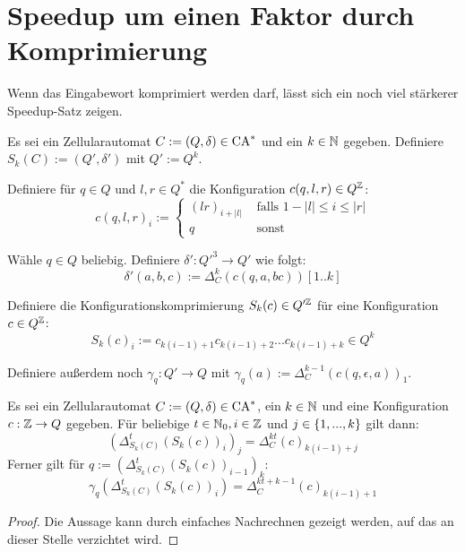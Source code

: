 \section{Speedup um einen Faktor durch Komprimierung}

Wenn das Eingabewort komprimiert werden darf, lässt sich ein noch viel stärkerer Speedup-Satz zeigen.

\begin{definition}
    \label{factorSpeedupConstruction}
    Es sei ein Zellularautomat $C := (Q, \delta) \in \textrm{CA}^*$ und ein $k \in \mathbb{N}$ gegeben.
    Definiere $S_k(C) := (Q', \delta')$ mit $Q' := Q^k$.
    
    Definiere für $q \in Q$ und $l, r \in Q^*$ die Konfiguration $c(q, l, r) \in Q^{\mathbb{Z}}$:
    \[
        c(q, l, r)_i := \begin{cases}
            (lr)_{i + |l|} & \text{ falls } 1-|l| \leq i \leq |r| \\
            q & \text{ sonst}
        \end{cases}
    \]
    
    Wähle $q \in Q$ beliebig.
    Definiere $\delta' : {Q'}^3 \to Q'$ wie folgt:
    \[
        \delta'(a, b, c) := \Delta_C^k(c(q, a, bc))[1..k]
    \]
    
    Definiere die Konfigurationskomprimierung $S_k(c) \in Q'^{\mathbb{Z}}$ für eine Konfiguration $c \in Q^{\mathbb{Z}}$:
    \[
        S_k(c)_i := c_{k(i - 1) + 1}c_{k(i - 1) + 2}...c_{k(i - 1) + k} \in Q^k
    \]
    
    Definiere außerdem noch $\gamma_q : Q' \to Q$ mit
    $\gamma_q(a) := \Delta^{k-1}_C(c(q, \epsilon, a))_1$.
\end{definition}

\begin{satz}
    \label{factorSpeedupConstructionCorrectness}
    Es sei ein Zellularautomat $C := (Q, \delta) \in \textrm{CA}^*$, ein $k \in \mathbb{N}$ und eine Konfiguration $c: \mathbb{Z} \to Q$ gegeben.
    Für beliebige $t \in \mathbb{N}_0, i \in \mathbb{Z}$ und $j \in \{ {1, ..., k} \}$ gilt dann:
    \[
        (\Delta^t_{S_k(C)}(S_k(c))_i)_j = \Delta^{kt}_C(c)_{k(i-1)+j}
    \]
    Ferner gilt für $q := (\Delta^t_{S_k(C)}(S_k(c))_{i-1})_k$:
    \[
        \gamma_{q}( \Delta^t_{S_k(C)}(S_k(c))_{i} )
        = \Delta^{kt+k-1}_C(c)_{k(i-1)+1}
    \]
\end{satz}
\begin{proof}
    Die Aussage kann durch einfaches Nachrechnen gezeigt werden, auf das an dieser Stelle verzichtet wird.
\end{proof}

